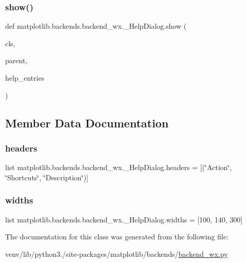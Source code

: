 \subsubsection{\texorpdfstring{show()}{show()}}
{\footnotesize\ttfamily def matplotlib.\+backends.\+backend\+\_\+wx.\+\_\+\+Help\+Dialog.\+show (\begin{DoxyParamCaption}\item[{}]{cls,  }\item[{}]{parent,  }\item[{}]{help\+\_\+entries }\end{DoxyParamCaption})}



\subsection{Member Data Documentation}
\mbox{\label{classmatplotlib_1_1backends_1_1backend__wx_1_1__HelpDialog_aa6eba5282da1a01258969f7067008c1c}} 
\subsubsection{\texorpdfstring{headers}{headers}}
{\footnotesize\ttfamily list matplotlib.\+backends.\+backend\+\_\+wx.\+\_\+\+Help\+Dialog.\+headers = \mbox{[}(\char`\"{}Action\char`\"{}, \char`\"{}Shortcuts\char`\"{}, \char`\"{}Description\char`\"{})\mbox{]}\hspace{0.3cm}{\ttfamily [static]}}

\mbox{\label{classmatplotlib_1_1backends_1_1backend__wx_1_1__HelpDialog_ac1d77443cdd7cd0a3ed70f677ed1ee0d}} 
\subsubsection{\texorpdfstring{widths}{widths}}
{\footnotesize\ttfamily list matplotlib.\+backends.\+backend\+\_\+wx.\+\_\+\+Help\+Dialog.\+widths = \mbox{[}100, 140, 300\mbox{]}\hspace{0.3cm}{\ttfamily [static]}}



The documentation for this class was generated from the following file\+:\begin{DoxyCompactItemize}
\item 
venv/lib/python3./site-\/packages/matplotlib/backends/\hyperlink{backend__wx_8py}{backend\+\_\+wx.\+py}\end{DoxyCompactItemize}
